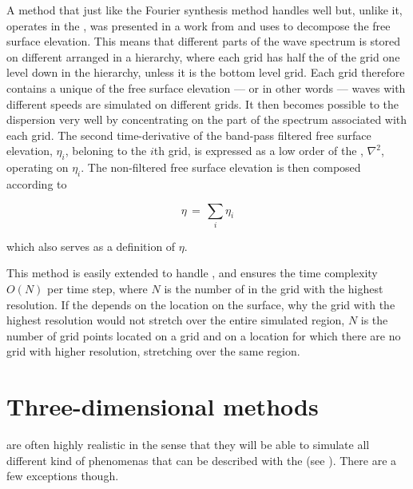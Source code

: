 A method that just like the Fourier synthesis method handles  well but, unlike it, operates in the , was presented in a work from \citeyear{Ottosson2011} \citep{Ottosson2011} and uses \LPD to decompose the free surface elevation. This means that different parts of the wave spectrum is stored on different \grids arranged in a hierarchy, where each grid has half the \resolution of the grid one level down in the hierarchy, unless it is the bottom level grid. Each grid therefore contains a unique  of the free surface elevation --- or in other words --- waves with different speeds are simulated on different grids. It then becomes possible to \approximate the dispersion very well by concentrating on the part of the spectrum associated with each grid. The second time-derivative of the band-pass filtered free surface elevation, $\eta_i$, beloning to the $i$th grid, is expressed as a low order \polynomial of the , $\nabla^2$, operating on $\eta_i$. The non-filtered free surface elevation is then composed according to

\begin{equation} \label{eq:laplacian_pyramid_composition}
\eta \,=\, \sum_i \eta_i
\end{equation}

which also serves as a definition of $\eta$.

This method is easily extended to handle \FSI, and ensures the time complexity $O(N)$ per time step, where $N$ is the number of  in the grid with the highest resolution. If the  depends on the location on the surface, why the grid with the highest resolution would not stretch over the entire simulated region, $N$ is the number of grid points located on a grid and on a location for which there are no grid with higher resolution, stretching over the same region.

\section{Three-dimensional methods}

 are often highly realistic in the sense that they will be able to simulate all different kind of phenomenas that can be described with the  (see ). There are a few exceptions though.

